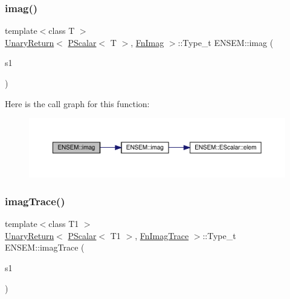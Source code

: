 \subsubsection{\texorpdfstring{imag()}{imag()}}
{\footnotesize\ttfamily template$<$class T $>$ \\
\mbox{\hyperlink{structENSEM_1_1UnaryReturn}{Unary\+Return}}$<$ \mbox{\hyperlink{classENSEM_1_1PScalar}{P\+Scalar}}$<$ T $>$, \mbox{\hyperlink{structENSEM_1_1FnImag}{Fn\+Imag}} $>$\+::Type\+\_\+t E\+N\+S\+E\+M\+::imag (\begin{DoxyParamCaption}\item[{const \mbox{\hyperlink{classENSEM_1_1PScalar}{P\+Scalar}}$<$ T $>$ \&}]{s1 }\end{DoxyParamCaption})\hspace{0.3cm}{\ttfamily [inline]}}

Here is the call graph for this function\+:\nopagebreak
\begin{figure}[H]
\begin{center}
\leavevmode
\includegraphics[width=350pt]{db/dcc/group__primscalar_ga81e1ff1466afc27ec3d09728fc37d340_cgraph}
\end{center}
\end{figure}
\mbox{\label{group__primscalar_gaf760659a12c2bd7668440d8b83333086}} 
\subsubsection{\texorpdfstring{imagTrace()}{imagTrace()}}
{\footnotesize\ttfamily template$<$class T1 $>$ \\
\mbox{\hyperlink{structENSEM_1_1UnaryReturn}{Unary\+Return}}$<$ \mbox{\hyperlink{classENSEM_1_1PScalar}{P\+Scalar}}$<$ T1 $>$, \mbox{\hyperlink{structENSEM_1_1FnImagTrace}{Fn\+Imag\+Trace}} $>$\+::Type\+\_\+t E\+N\+S\+E\+M\+::imag\+Trace (\begin{DoxyParamCaption}\item[{const \mbox{\hyperlink{classENSEM_1_1PScalar}{P\+Scalar}}$<$ T1 $>$ \&}]{s1 }\end{DoxyParamCaption})\hspace{0.3cm}{\ttfamily [inline]}}

